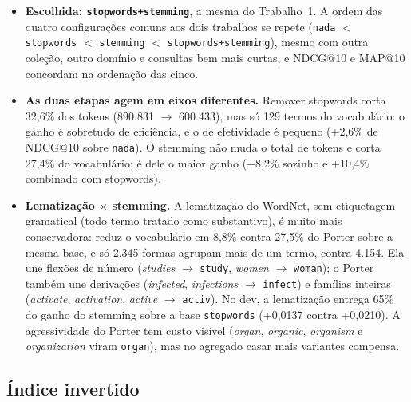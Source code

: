 \documentclass[10pt,a4paper]{article}
\begin{document}
\begin{itemize}
\item \textbf{Escolhida: \texttt{stopwords+stemming}}, a mesma do Trabalho~1. A ordem das quatro configurações comuns aos dois trabalhos se repete (\texttt{nada} $<$ \texttt{stopwords} $<$ \texttt{stemming} $<$ \texttt{stopwords+stemming}), mesmo com outra coleção, outro domínio e consultas bem mais curtas, e NDCG@10 e MAP@10 concordam na ordenação das cinco.
\item \textbf{As duas etapas agem em eixos diferentes.} Remover stopwords corta 32,6\% dos tokens (890.831 $\to$ 600.433), mas só 129 termos do vocabulário: o ganho é sobretudo de eficiência, e o de efetividade é pequeno (+2,6\% de NDCG@10 sobre \texttt{nada}). O stemming não muda o total de tokens e corta 27,4\% do vocabulário; é dele o maior ganho (+8,2\% sozinho e +10,4\% combinado com stopwords).
\item \textbf{Lematização $\times$ stemming.} A lematização do WordNet, sem etiquetagem gramatical (todo termo tratado como substantivo), é muito mais conservadora: reduz o vocabulário em 8,8\% contra 27,5\% do Porter sobre a mesma base, e só 2.345 formas agrupam mais de um termo, contra 4.154. Ela une flexões de número (\emph{studies} $\to$ \texttt{study}, \emph{women} $\to$ \texttt{woman}); o Porter também une derivações (\emph{infected}, \emph{infections} $\to$ \texttt{infect}) e famílias inteiras (\emph{activate}, \emph{activation}, \emph{active} $\to$ \texttt{activ}). No dev, a lematização entrega 65\% do ganho do stemming sobre a base \texttt{stopwords} (+0,0137 contra +0,0210). A agressividade do Porter tem custo visível (\emph{organ}, \emph{organic}, \emph{organism} e \emph{organization} viram \texttt{organ}), mas no agregado casar mais variantes compensa.
\end{itemize}

\subsection{Índice invertido}
\end{document}
